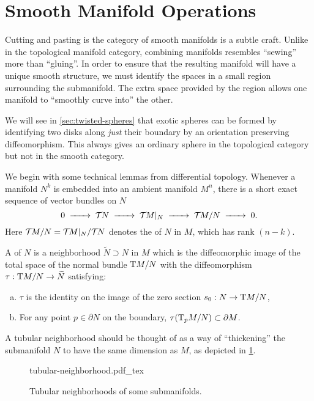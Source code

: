 \pagebreak
\section{Smooth Manifold Operations}\label{sec:smooth-manifold-operations}

Cutting and pasting is the category of smooth manifolds is a subtle craft. 
Unlike in the topological manifold category, combining manifolds resembles ``sewing'' more than ``gluing''. In order to ensure that the resulting manifold will have a unique smooth structure, we must identify the spaces in a small region surrounding the submanifold. The extra space provided by the region allows one manifold to ``smoothly curve into'' the other.

\begin{remark} 
	We will see in \cref{sec:twisted-spheres} that exotic spheres can be formed by identifying two disks along \emph{just} their boundary by an orientation preserving diffeomorphism. This always gives an ordinary sphere in the topological category but not in the smooth category.
\end{remark}

We begin with some technical lemmas from differential topology. Whenever a manifold $N^k$ is embedded into an ambient manifold $M^n$, there is a short exact sequence of vector bundles on $N$
\begin{equation}
	0 \lkxto \TT N\lkxto \TT M|_N \lkxto \TT M/N \lkxto 0.
\end{equation}
Here ${\mathcal{T}\hspace{-0.1em}} M/N={\mathcal{T}\hspace{-0.1em}} M|_N / {\mathcal{T}\hspace{-0.1em}} N$ denotes the  of $N$ in $M$, which has rank $(n-k)$.

A  of $N$ is a neighborhood $\widetilde{N}\supset N$ in $M$ which is the diffeomorphic image of the total space of the normal bundle $\mathrm{T} M/N$ with the diffeomorphism $\tau : \mathrm{T} M/N \to \widetilde{N}$ satisfying:
\begin{enumerate}[(a)]
	\item $\tau$ is the identity on the image of the zero section $s_0 : N \to \mathrm{T} M/N$,
	\item For any point $p\in \partial N$ on the boundary, $\tau(\mathrm{T}_p M/N)\subset \partial M$.
\end{enumerate}


A tubular neighborhood should be thought of as a way of ``thickening'' the submanifold $N$ to have the same dimension as $M$, as depicted in \cref{fig:tubular-neighborhood}. 

\begin{figure}[ht]
	\centering
	{tubular-neighborhood.pdf_tex}
	\caption{Tubular neighborhoods of some submanifolds.}\label{fig:tubular-neighborhood}
\end{figure}

